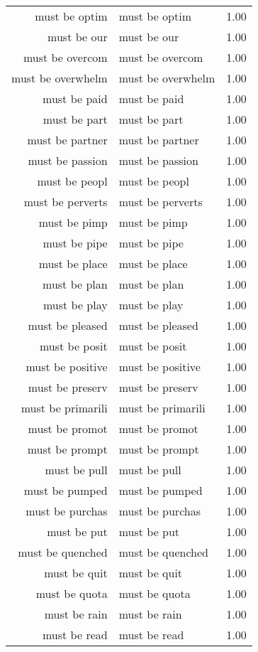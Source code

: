 \begin{table}[ht]
\begin{tabular}{rlr}
  must be optim & must be optim & 1.00 \\ 
  must be our & must be our & 1.00 \\ 
  must be overcom & must be overcom & 1.00 \\ 
  must be overwhelm & must be overwhelm & 1.00 \\ 
  must be paid & must be paid & 1.00 \\ 
  must be part & must be part & 1.00 \\ 
  must be partner & must be partner & 1.00 \\ 
  must be passion & must be passion & 1.00 \\ 
  must be peopl & must be peopl & 1.00 \\ 
  must be perverts & must be perverts & 1.00 \\ 
  must be pimp & must be pimp & 1.00 \\ 
  must be pipe & must be pipe & 1.00 \\ 
  must be place & must be place & 1.00 \\ 
  must be plan & must be plan & 1.00 \\ 
  must be play & must be play & 1.00 \\ 
  must be pleased & must be pleased & 1.00 \\ 
  must be posit & must be posit & 1.00 \\ 
  must be positive & must be positive & 1.00 \\ 
  must be preserv & must be preserv & 1.00 \\ 
  must be primarili & must be primarili & 1.00 \\ 
  must be promot & must be promot & 1.00 \\ 
  must be prompt & must be prompt & 1.00 \\ 
  must be pull & must be pull & 1.00 \\ 
  must be pumped & must be pumped & 1.00 \\ 
  must be purchas & must be purchas & 1.00 \\ 
  must be put & must be put & 1.00 \\ 
  must be quenched & must be quenched & 1.00 \\ 
  must be quit & must be quit & 1.00 \\ 
  must be quota & must be quota & 1.00 \\ 
  must be rain & must be rain & 1.00 \\ 
  must be read & must be read & 1.00 \\ 

\end{tabular}
\end{table}
